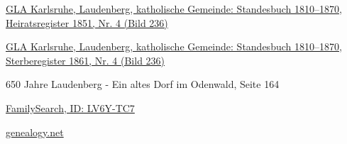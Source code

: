 \begin{person}[
    surname = {Zimmermann},
    givenname = {Johann Valentin},
    suffix = {1830--1861},
    label = {@I396@}
    ]
\begin{enumerate}[label={[\arabic*]}]
\item \href{http://www.landesarchiv-bw.de/plink/?f=4-1119439-236}{GLA Karlsruhe, Laudenberg, katholische Gemeinde: Standesbuch 1810–1870, Heiratsregister 1851, Nr. 4 (Bild 236)}
\item \href{http://www.landesarchiv-bw.de/plink/?f=4-1119439-296}{GLA Karlsruhe, Laudenberg, katholische Gemeinde: Standesbuch 1810–1870, Sterberegister 1861, Nr. 4 (Bild 236)}
\item 650 Jahre Laudenberg - Ein altes Dorf im Odenwald, Seite 164
\item \href{https://www.familysearch.org/tree/person/details/LV6Y-TC7}{FamilySearch, ID: LV6Y-TC7}
\item \href{http://gedbas.genealogy.net/person/show/1172964848}{genealogy.net}
\end{enumerate}

\end{person}

